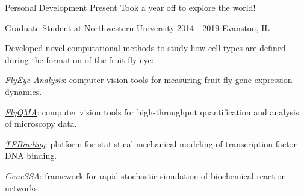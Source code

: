 
\begin{cventries}


  \cventrynew
	{Personal Development}    
    {Present} 
    {}
    {Took a year off to explore the world!} 

  \cventrynew
	{Graduate Student at Northwestern University}    
    {2014 - 2019} %
    {Evanston, IL} %
    {Developed novel computational methods to study how cell types are defined during the formation of the fruit fly eye:
     \vspace{4.0mm}
      \begin{cvitems} 
         \item {\emph{\href{https://github.com/sebastianbernasek/flyeye}{FlyEye Analysis}}: computer vision tools for measuring fruit fly gene expression dynamics.}
         \item {\emph{\href{https://sebastianbernasek.github.io/flyqma/index.html}{FlyQMA}}: computer vision tools for high-throughput quantification and analysis of microscopy data.}
         \item {\emph{\href{https://github.com/sebastianbernasek/binding}{TFBinding}}: platform for statistical mechanical modeling of transcription factor DNA binding.}  
         \item {\emph{\href{https://github.com/sebastianbernasek/genessa}{GeneSSA}}: framework for rapid stochastic simulation of biochemical reaction networks.}      
      \end{cvitems}  
     \vspace{6.0mm}
}
\end{cventries}
